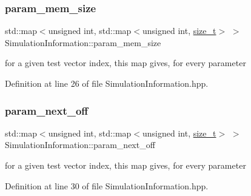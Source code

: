 \mbox{\label{classSimulationInformation_adbb84c97177feabb6612994533ea4e4a}} 
\subsubsection{\texorpdfstring{param\+\_\+mem\+\_\+size}{param\_mem\_size}}
{\footnotesize\ttfamily std\+::map$<$unsigned int, std\+::map$<$unsigned int, \hyperlink{tutorial__fpt__2017_2intro_2sixth_2test_8c_a7c94ea6f8948649f8d181ae55911eeaf}{size\+\_\+t}$>$ $>$ Simulation\+Information\+::param\+\_\+mem\+\_\+size}



for a given test vector index, this map gives, for every parameter 



Definition at line 26 of file Simulation\+Information.\+hpp.

\mbox{\label{classSimulationInformation_a455ec40895df5c01e1bb8f015717248c}} 
\subsubsection{\texorpdfstring{param\+\_\+next\+\_\+off}{param\_next\_off}}
{\footnotesize\ttfamily std\+::map$<$unsigned int, std\+::map$<$unsigned int, \hyperlink{tutorial__fpt__2017_2intro_2sixth_2test_8c_a7c94ea6f8948649f8d181ae55911eeaf}{size\+\_\+t}$>$ $>$ Simulation\+Information\+::param\+\_\+next\+\_\+off}



for a given test vector index, this map gives, for every parameter 



Definition at line 30 of file Simulation\+Information.\+hpp.

\mbox{\label{classSimulationInformation_a296958989f9c4c8e896494f0c4e56a25}} 
